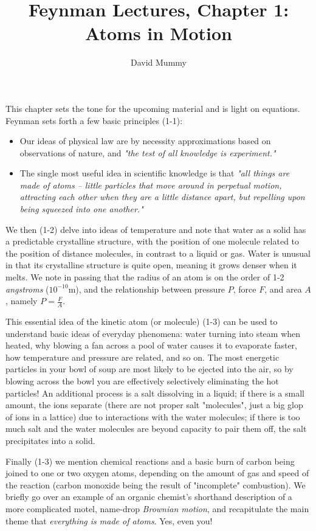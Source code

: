 \documentclass[10pt,letterpaper]{article}
\author{David Mummy}
\title{Feynman Lectures, Chapter 1: Atoms in Motion}
\begin{document}
\maketitle
This chapter sets the tone for the upcoming material and is light on equations. Feynman sets forth a few basic principles (1-1): 
\begin{itemize}
\item Our ideas of physical law are by necessity approximations based on observations of nature, and \textit{"the test of all knowledge is experiment."}
\item The single most useful idea in scientific knowledge is that \textit{"all things are made of atoms -- little particles that move around in perpetual motion, attracting each other when they are a little distance apart, but repelling upon being squeezed into one another."}
\end{itemize}
We then (1-2) delve into ideas of temperature and note that water as a solid has a predictable crystalline structure, with the position of one molecule related to the position of distance molecules, in contrast to a liquid or gas. Water is unusual in that its crystalline structure is quite open, meaning it grows denser when it melts. We note in passing that the radius of an atom is on the order of 1-2 \textit{angstroms} ($10^{-10}$m), and the relationship between pressure $P$, force $F$, and area $A$, namely $P=\frac{F}{A}$.

This essential  idea of the kinetic atom (or molecule) (1-3) can be used to understand basic ideas of everyday phenomena: water turning into steam when heated, why blowing a fan across a pool of water causes it to evaporate faster, how temperature and pressure are related, and so on. The most energetic particles in your bowl of soup are most likely to be ejected into the air, so by blowing across the bowl you are effectively selectively eliminating the hot particles! An additional process is a salt dissolving in a liquid; if there is a small amount, the ions separate (there are not proper salt "molecules", just a big glop of ions in a lattice) due to interactions with the water molecules; if there is too much salt and the water molecules are beyond capacity to pair them off, the salt precipitates into a solid. 

Finally (1-3) we mention chemical reactions and a basic burn of carbon being joined to one or two oxygen atoms, depending on the amount of gas and speed of the reaction (carbon monoxide being the result of "incomplete" combustion). We briefly go over an example of an organic chemist's shorthand description of a more complicated motel, name-drop \textit{Brownian motion}, and recapitulate the main theme that \textit{everything is made of atoms}. Yes, even you! 
\end{document}
